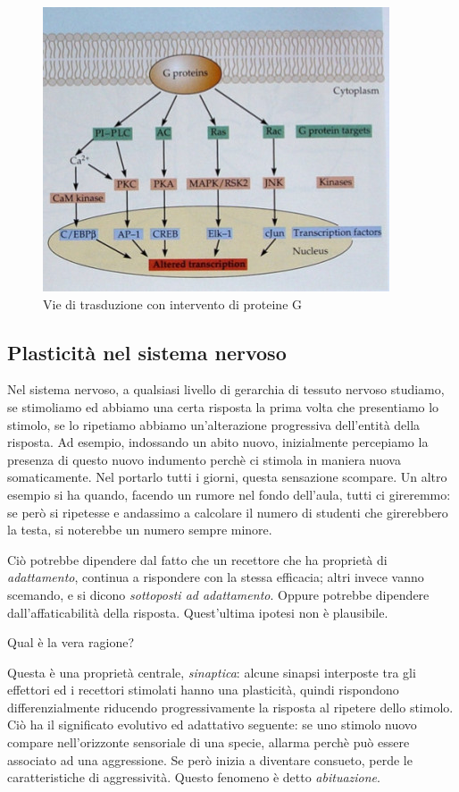 \documentclass[a4paper,12pt]{article}
\begin{document}
\begin{figure}[H]
\centering
\includegraphics[scale=0.4]{immagine/G_p.jpg}
\caption{Vie di trasduzione con intervento di proteine G}
\end{figure}

\subsection{Plasticità nel sistema nervoso}
Nel sistema nervoso, a qualsiasi livello di gerarchia di tessuto nervoso studiamo, se stimoliamo ed abbiamo una certa risposta la prima volta che presentiamo lo stimolo, se lo ripetiamo abbiamo un'alterazione progressiva dell'entità della risposta. Ad esempio, indossando un abito nuovo, inizialmente percepiamo la presenza di questo nuovo indumento perchè ci stimola in maniera nuova somaticamente. Nel portarlo tutti i giorni, questa sensazione scompare. Un altro esempio si ha quando, facendo un rumore nel fondo dell'aula, tutti ci gireremmo: se però si ripetesse e andassimo a calcolare il numero di studenti che girerebbero la testa, si noterebbe un numero sempre minore.

Ciò potrebbe dipendere dal fatto che un recettore che ha proprietà di \emph{adattamento}, continua a rispondere con la stessa efficacia; altri invece vanno scemando, e si dicono \emph{sottoposti ad adattamento}. Oppure potrebbe dipendere dall'affaticabilità della risposta. Quest'ultima ipotesi non è plausibile.

Qual è la vera ragione?

Questa è una proprietà centrale, \emph{sinaptica}: alcune sinapsi interposte tra gli effettori ed i recettori stimolati hanno una plasticità, quindi rispondono differenzialmente riducendo progressivamente la risposta al ripetere dello stimolo. Ciò ha il significato evolutivo ed adattativo seguente: se uno stimolo nuovo compare nell'orizzonte sensoriale di una specie, allarma perchè può essere associato ad una aggressione. Se però inizia a diventare consueto, perde le caratteristiche di aggressività. Questo fenomeno è detto \emph{abituazione}.
\end{document}
